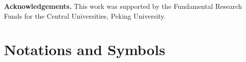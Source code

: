 \documentclass[10pt,journal,compsoc]{IEEEtran}
\begin{document}
\noindent\textbf{Acknowledgements.}
This work was supported by the Fundamental Research Funds for the Central Universities, Peking University.


\appendix
\small
\section{Notations and Symbols}
\label{app:notation}

\end{document}
